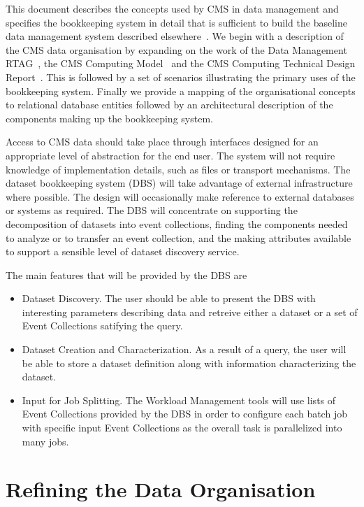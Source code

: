 \documentclass{cmspaper}
\begin{document}
This document describes the concepts used by CMS in data management and
specifies the bookkeeping system in detail that is sufficient to build the
baseline data management system described elsewhere~\cite{dmman}.  We begin
with a description of the CMS data organisation by expanding on the work of
the Data Management RTAG~\cite{rtag7}, the CMS Computing Model~\cite{CM} and
the CMS Computing Technical Design Report~\cite{CTDR}.
This is followed by a set of scenarios illustrating the primary uses of the
bookkeeping system.  Finally we provide a mapping of the organisational
concepts to relational database entities followed by an architectural
description of the components making up the bookkeeping system.

Access to CMS data should take place through interfaces designed for an 
appropriate level of abstraction for the end user.  The system will not require 
knowledge of implementation details, such as files or transport mechanisms. 
The dataset bookkeeping system (DBS) will take advantage of external infrastructure where 
possible.  The design will occasionally make 
reference to external databases or systems as required.  The DBS will 
concentrate on supporting the decomposition of datasets into event collections, 
finding the 
components needed to analyze or to transfer an event collection, and the making 
attributes available to support a sensible level of dataset discovery service.  

The main features that will be provided by the DBS are 
\begin{itemize}
\item Dataset Discovery.  The user should be able to present the DBS with 
interesting parameters describing data and retreive either a dataset or
a set of Event Collections satifying the query.
\item Dataset Creation and Characterization.  As a result of a query, the 
user will be able to store a dataset definition along with information 
characterizing the dataset.
\item Input for Job Splitting. The Workload Management tools will use
lists of Event Collections provided by the DBS in order to configure each
batch job with specific input Event Collections as the overall task is
parallelized into many jobs.

\end{itemize}

\section{Refining the Data Organisation}
\end{document}
